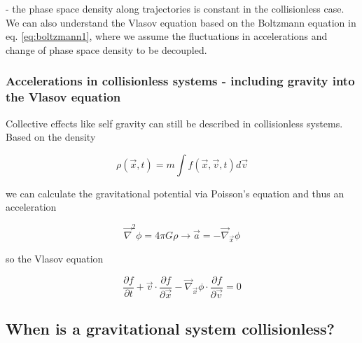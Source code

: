 - the phase space density along trajectories is constant in the collisionless case. We can also understand
the Vlasov equation based on the Boltzmann equation in eq. \ref{eq:boltzmann1}, where we assume the fluctuations
in accelerations and change of phase space density to be decoupled.

\subsubsection{Accelerations in collisionless systems - including gravity into the Vlasov equation}
Collective effects like self gravity can still be described in collisionless systems. Based on the density

\begin{equation}
    \rho(\vec{x},t) = m \int f(\vec{x},\vec{v},t) d\vec{v}
\end{equation}

we can calculate the gravitational potential via Poisson's equation and thus an acceleration

\begin{equation}
    \vec{\nabla}^2 \phi = 4\pi G \rho \rightarrow \vec{a} = -\vec{\nabla}_\vec{x} \phi
\end{equation}

so the Vlasov equation

\begin{equation}
    \frac{\partial f}{\partial t}+\vec{v} \cdot \frac{\partial f}{\partial \vec{x}} - \vec{\nabla}_\vec{x} \phi \cdot \frac{\partial f}{\partial \vec{v}}=0
\end{equation}


\subsection{When is a gravitational system collisionless?}

